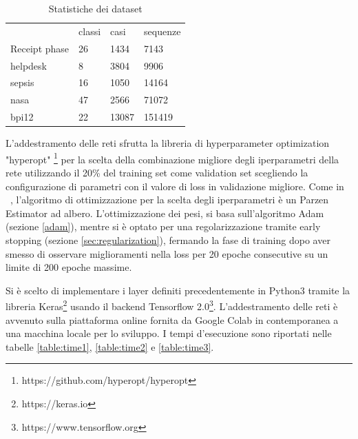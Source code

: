 \documentclass[12pt,a4paper]{report}
\begin{document}
    \begin{table}[t]
    \caption{Statistiche dei dataset}
    \begin{center} \label{table:dataset}
    \begin{tabular}[t]{llll}
        \hline
                        & classi    & casi  & sequenze \\
        Receipt phase   & 26        & 1434  & 7143     \\
        helpdesk        & 8         & 3804  & 9906     \\
        sepsis          & 16        & 1050  & 14164    \\
        nasa            & 47        & 2566  & 71072    \\
        bpi12           & 22        & 13087 & 151419   \\
        \hline
    \end{tabular}
    \end{center}
    \end{table}
    L'addestramento delle reti sfrutta la libreria di hyperparameter
    optimization "hyperopt"
    \footnote{https://github.com/hyperopt/hyperopt} per la scelta della
    combinazione migliore degli iperparametri della rete utilizzando
    il 20\% del training set come validation set scegliendo la 
    configurazione di parametri con il valore di loss in validazione
    migliore. Come in ~\cite{10.1007/978-3-030-35166-3_25}, l'algoritmo 
    di ottimizzazione per la scelta degli iperparametri \`e un 
    Parzen Estimator ad albero. L'ottimizzazione dei pesi, si basa
    sull'algoritmo Adam (sezione \ref{adam}), mentre si \`e optato per
    una regolarizzazione tramite early stopping (sezione 
    \ref{sec:regularization}), fermando la fase di training dopo aver
    smesso di osservare miglioramenti nella loss per 20 epoche 
    consecutive su un limite di 200 epoche massime.

    Si \`e scelto di implementare i layer definiti precedentemente in 
    Python3 tramite la libreria Keras\footnote{https://keras.io} usando
    il backend Tensorflow 2.0\footnote{https://www.tensorflow.org}. 
    L'addestramento delle reti \`e avvenuto sulla piattaforma online 
    fornita da Google Colab in contemporanea a una macchina locale per 
    lo sviluppo. I tempi d'esecuzione sono riportati nelle tabelle
    \ref{table:time1}, \ref{table:time2} e \ref{table:time3}.
\end{document}
